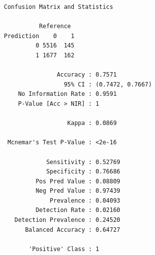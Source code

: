 \documentclass[
  letterpaper,
  DIV=11,
  numbers=noendperiod]{scrreprt}
\newenvironment{Shaded}{\begin{snugshade}}{\end{snugshade}}
\newcommand{\AttributeTok}[1]{\textcolor[rgb]{0.40,0.45,0.13}{#1}}
\newcommand{\CommentTok}[1]{\textcolor[rgb]{0.37,0.37,0.37}{#1}}
\newcommand{\DecValTok}[1]{\textcolor[rgb]{0.68,0.00,0.00}{#1}}
\newcommand{\FunctionTok}[1]{\textcolor[rgb]{0.28,0.35,0.67}{#1}}
\newcommand{\NormalTok}[1]{\textcolor[rgb]{0.00,0.23,0.31}{#1}}
\newcommand{\OtherTok}[1]{\textcolor[rgb]{0.00,0.23,0.31}{#1}}
\newcommand{\SpecialCharTok}[1]{\textcolor[rgb]{0.37,0.37,0.37}{#1}}
\newcommand{\StringTok}[1]{\textcolor[rgb]{0.13,0.47,0.30}{#1}}
\begin{document}
\begin{verbatim}
Confusion Matrix and Statistics

          Reference
Prediction    0    1
         0 5516  145
         1 1677  162
                                          
               Accuracy : 0.7571          
                 95% CI : (0.7472, 0.7667)
    No Information Rate : 0.9591          
    P-Value [Acc > NIR] : 1               
                                          
                  Kappa : 0.0869          
                                          
 Mcnemar's Test P-Value : <2e-16          
                                          
            Sensitivity : 0.52769         
            Specificity : 0.76686         
         Pos Pred Value : 0.08809         
         Neg Pred Value : 0.97439         
             Prevalence : 0.04093         
         Detection Rate : 0.02160         
   Detection Prevalence : 0.24520         
      Balanced Accuracy : 0.64727         
                                          
       'Positive' Class : 1               
                                          
\end{verbatim}

\begin{Shaded}
\end{Shaded}
\end{document}

